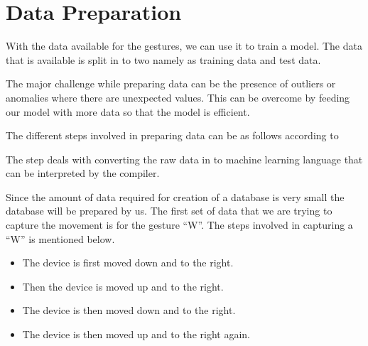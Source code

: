 \section{Data Preparation}


With the data available for the gestures, we can use it to train a model. The data that is available is split in to two namely as training data and test data.

The major challenge while preparing data can be the presence of outliers or anomalies where there are unexpected values. This can be overcome by feeding our model with more data so that the model is efficient. \cite{Warden:2020}

The different steps involved in preparing data can be as follows according to \cite{Warden:2020}


The step deals with converting the raw data in to machine learning language that can be interpreted by the compiler. 
 


Since the amount of data required for creation of a database is very small the database will be prepared by us. The first set of data that we are trying to capture the movement is for the gesture ``W''. The steps involved in capturing a ``W'' is mentioned below. \cite{Warden:2020}

\begin{center}
\end{center}


\begin{itemize}
    
    \item The device is first moved down and to the right.
    \item Then the device is moved up and to the right.
    \item The device is then moved down and to the right.
    \item  The device is then moved up and to the right again. 
    
\end{itemize}

